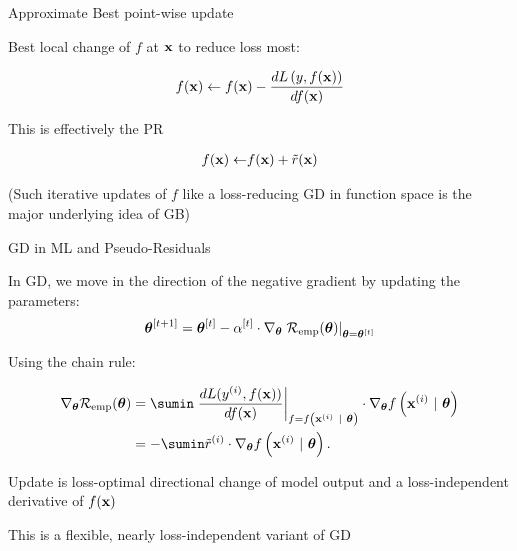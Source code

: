 \documentclass[11pt,compress,t,notes=noshow, xcolor=table]{beamer}
\begin{document}
\begin{framei}[sep=M, fs=normal]{Approximate Best point-wise update}

\item Best local change of $f$ at $\mathbf{x}$ to reduce loss most:

$$
f(\mathbf{x}) \leftarrow f(\mathbf{x}) - \frac{d L\left(y, f(\mathbf{x})\right)}{d f(\mathbf{x})} 
$$

\item This is effectively the PR 

\begin{align*}
f(\mathbf{x}) \leftarrow& f(\mathbf{x}) + \tilde{r}(\mathbf{x})\\ 
\end{align*}

\item (Such iterative updates of $f$ like a loss-reducing GD in function space is the major underlying idea of GB)

\end{framei}


\begin{framei}[sep=M]{GD in ML and Pseudo-Residuals}

\item In GD, we move in the direction of the negative gradient by updating the parameters: 
$$\bm{\theta}^{[t + 1]} = \bm{\theta}^{[t]} - \alpha^{[t]} \cdot \nabla_{\bm{\theta}} \left.\mathcal{R}_{\text{emp}}(\bm{\theta})\right|_{\bm{\theta} = \bm{\theta}^{[t]}}	$$

\item Using the chain rule:

\begin{align*}
\nabla_{\thetav} \risket &=\sumin \left.\frac{d L(\yi, \fx)}{d \fx} \right|_{f = \fxit} 
\cdot \nabla_{\thetav} \fxit \\ 
&= - \sumin \tilde r^{(i)} \cdot \nabla_{\thetav} \fxit.
\end{align*}
\item Update is loss-optimal directional change of model output 
and a loss-independent derivative of $f(\mathbf{x})$
\item This is a flexible, nearly loss-independent variant of GD

\end{framei}
\end{document}
